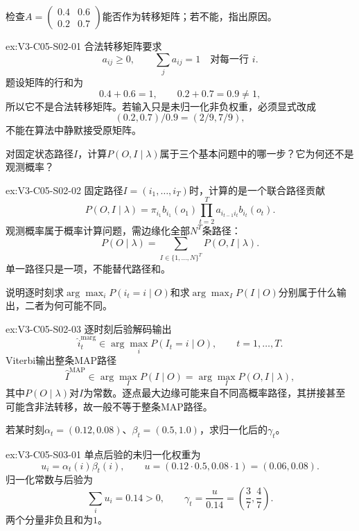\begin{SLChapterExercisePairSection}
\begin{exercise}\label{ex:V3-C05-S02-01}
检查$A=\begin{pmatrix}0.4&0.6\\0.2&0.7\end{pmatrix}$能否作为转移矩阵；若不能，指出原因。
\end{exercise}
\ifSLFullEdition
{}\label{sol:V3-C05-S02-01}
\begin{chapterexercisesolution}{ex:V3-C05-S02-01}
合法转移矩阵要求
\[
a_{ij}\geq0,
\qquad
\sum_ja_{ij}=1\quad\text{对每一行 }i.
\]
题设矩阵的行和为
\[
0.4+0.6=1,
\qquad
0.2+0.7=0.9\neq1,
\]
所以它不是合法转移矩阵。若输入只是未归一化非负权重，必须显式改成
\[
(0.2,0.7)/0.9=(2/9,7/9),
\]
不能在算法中静默接受原矩阵。
\end{chapterexercisesolution}
\fi

\begin{exercise}\label{ex:V3-C05-S02-02}
对固定状态路径$I$，计算$P(O,I\mid\lambda)$属于三个基本问题中的哪一步？它为何还不是观测概率？
\end{exercise}
\ifSLFullEdition
{}\label{sol:V3-C05-S02-02}
\begin{chapterexercisesolution}{ex:V3-C05-S02-02}
固定路径$I=(i_1,\ldots,i_T)$时，计算的是一个联合路径贡献
\[
P(O,I\mid\lambda)
=\pi_{i_1}b_{i_1}(o_1)
\prod_{t=2}^{T}a_{i_{t-1}i_t}b_{i_t}(o_t).
\]
观测概率属于概率计算问题，需边缘化全部$N^T$条路径：
\[
P(O\mid\lambda)=\sum_{I\in\{1,\ldots,N\}^{T}}P(O,I\mid\lambda).
\]
单一路径只是一项，不能替代路径和。
\end{chapterexercisesolution}
\fi

\begin{exercise}\label{ex:V3-C05-S02-03}
说明逐时刻求$\arg\max_i P(i_t=i\mid O)$和求$\arg\max_I P(I\mid O)$分别属于什么输出，二者为何可能不同。
\end{exercise}
\ifSLFullEdition
{}\label{sol:V3-C05-S02-03}
\begin{chapterexercisesolution}{ex:V3-C05-S02-03}
逐时刻后验解码输出
\[
\widehat i_t^{\mathrm{marg}}\in\arg\max_iP(I_t=i\mid O),
\qquad t=1,\ldots,T.
\]
Viterbi输出整条MAP路径
\[
\widehat I^{\mathrm{MAP}}\in\arg\max_IP(I\mid O)
=\arg\max_IP(O,I\mid\lambda),
\]
其中$P(O\mid\lambda)$对$I$为常数。逐点最大边缘可能来自不同高概率路径，其拼接甚至可能含非法转移，故一般不等于整条MAP路径。
\end{chapterexercisesolution}
\fi

\begin{exercise}\label{ex:V3-C05-S03-01}
若某时刻$\alpha_t=(0.12,0.08)$、$\beta_t=(0.5,1.0)$，求归一化后的$\gamma_t$。
\end{exercise}
\ifSLFullEdition
{}\label{sol:V3-C05-S03-01}
\begin{chapterexercisesolution}{ex:V3-C05-S03-01}
单点后验的未归一化权重为
\[
u_i=\alpha_t(i)\beta_t(i),
\qquad
u=(0.12\cdot0.5,0.08\cdot1)=(0.06,0.08).
\]
归一化常数与后验为
\[
\sum_iu_i=0.14>0,
\qquad
\gamma_t=\frac{u}{0.14}
=\left(\frac37,\frac47\right).
\]
两个分量非负且和为$1$。
\end{chapterexercisesolution}
\fi


\end{SLChapterExercisePairSection}
